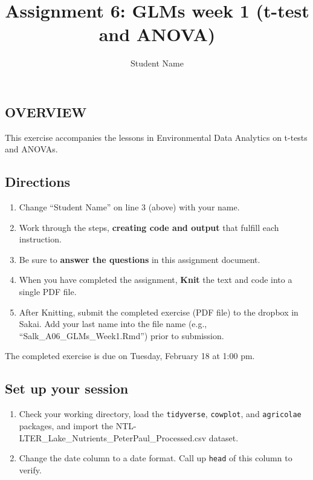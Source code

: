 \documentclass[]{article}
\title{Assignment 6: GLMs week 1 (t-test and ANOVA)}
\author{Student Name}
\date{}
\providecommand{\tightlist}{%
  \setlength{\itemsep}{0pt}\setlength{\parskip}{0pt}}
\begin{document}
\maketitle

\hypertarget{overview}{%
\subsection{OVERVIEW}\label{overview}}

This exercise accompanies the lessons in Environmental Data Analytics on
t-tests and ANOVAs.

\hypertarget{directions}{%
\subsection{Directions}\label{directions}}

\begin{enumerate}
\def\labelenumi{\arabic{enumi}.}
\tightlist
\item
  Change ``Student Name'' on line 3 (above) with your name.
\item
  Work through the steps, \textbf{creating code and output} that fulfill
  each instruction.
\item
  Be sure to \textbf{answer the questions} in this assignment document.
\item
  When you have completed the assignment, \textbf{Knit} the text and
  code into a single PDF file.
\item
  After Knitting, submit the completed exercise (PDF file) to the
  dropbox in Sakai. Add your last name into the file name (e.g.,
  ``Salk\_A06\_GLMs\_Week1.Rmd'') prior to submission.
\end{enumerate}

The completed exercise is due on Tuesday, February 18 at 1:00 pm.

\hypertarget{set-up-your-session}{%
\subsection{Set up your session}\label{set-up-your-session}}

\begin{enumerate}
\def\labelenumi{\arabic{enumi}.}
\item
  Check your working directory, load the \texttt{tidyverse},
  \texttt{cowplot}, and \texttt{agricolae} packages, and import the
  NTL-LTER\_Lake\_Nutrients\_PeterPaul\_Processed.csv dataset.
\item
  Change the date column to a date format. Call up \texttt{head} of this
  column to verify.
\end{enumerate}
\end{document}
